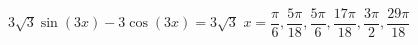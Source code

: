 { $3\sqrt{3}\sin(3x) - 3\cos(3x) = 3\sqrt{3}$}
{ $x = \dfrac{\pi}{6}, \dfrac{5\pi}{18}, \dfrac{5\pi}{6}, \dfrac{17\pi}{18}, \dfrac{3\pi}{2}, \dfrac{29\pi}{18}$}

